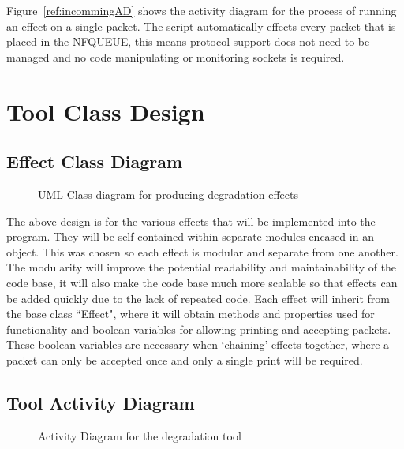 Figure~\ref{ref:incommingAD} shows the activity diagram for the process of running an effect on a single packet. The script automatically effects every packet that is placed in the NFQUEUE, this means protocol support does not need to be managed and no code manipulating or monitoring sockets is required.

%
\section{Tool Class Design}
\subsection{Effect Class Diagram}

\begin{center}
	
	\begin{figure}[h]
		\caption{UML Class diagram for producing degradation effects}
	\end{figure}
\end{center}

The above design is for the various effects that will be implemented into the program. They will be self contained within separate modules encased in an object. This was chosen so each effect is modular and separate from one another. The modularity will improve the potential readability and maintainability of the code base, it will also make the code base much more scalable so that effects can be added quickly due to the lack of repeated code.  Each effect will inherit from the base class ``Effect", where it will obtain methods and properties used for functionality and boolean variables for allowing printing and accepting packets. These boolean variables are necessary when `chaining' effects together, where a packet can only be accepted once and only a single print will be required.

\clearpage
\subsection{Tool Activity Diagram}
\begin{center}
	
	\begin{figure}[h]
		\caption{Activity Diagram for the degradation tool}
		\label{ref:ToolAD}
	\end{figure}
\end{center}

